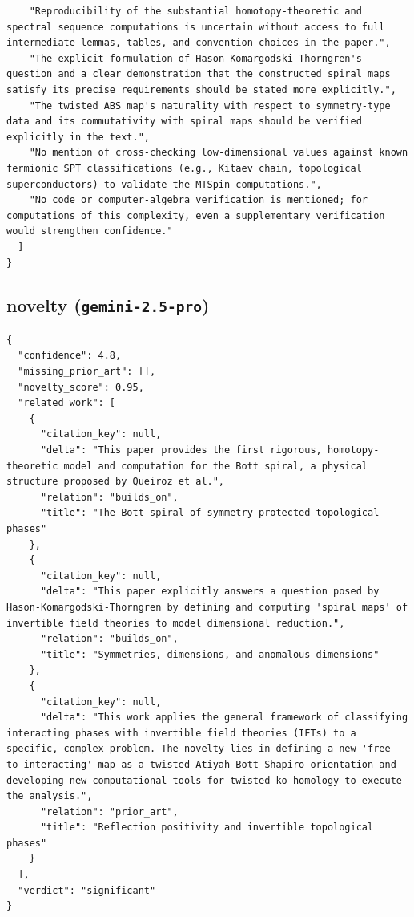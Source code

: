 \documentclass[11pt]{article}
\begin{document}
\begin{verbatim}
    "Reproducibility of the substantial homotopy-theoretic and spectral sequence computations is uncertain without access to full intermediate lemmas, tables, and convention choices in the paper.",
    "The explicit formulation of Hason–Komargodski–Thorngren's question and a clear demonstration that the constructed spiral maps satisfy its precise requirements should be stated more explicitly.",
    "The twisted ABS map's naturality with respect to symmetry-type data and its commutativity with spiral maps should be verified explicitly in the text.",
    "No mention of cross-checking low-dimensional values against known fermionic SPT classifications (e.g., Kitaev chain, topological superconductors) to validate the MTSpin computations.",
    "No code or computer-algebra verification is mentioned; for computations of this complexity, even a supplementary verification would strengthen confidence."
  ]
}
\end{verbatim}

\subsection*{novelty (\texttt{gemini-2.5-pro})}
\begin{verbatim}
{
  "confidence": 4.8,
  "missing_prior_art": [],
  "novelty_score": 0.95,
  "related_work": [
    {
      "citation_key": null,
      "delta": "This paper provides the first rigorous, homotopy-theoretic model and computation for the Bott spiral, a physical structure proposed by Queiroz et al.",
      "relation": "builds_on",
      "title": "The Bott spiral of symmetry-protected topological phases"
    },
    {
      "citation_key": null,
      "delta": "This paper explicitly answers a question posed by Hason-Komargodski-Thorngren by defining and computing 'spiral maps' of invertible field theories to model dimensional reduction.",
      "relation": "builds_on",
      "title": "Symmetries, dimensions, and anomalous dimensions"
    },
    {
      "citation_key": null,
      "delta": "This work applies the general framework of classifying interacting phases with invertible field theories (IFTs) to a specific, complex problem. The novelty lies in defining a new 'free-to-interacting' map as a twisted Atiyah-Bott-Shapiro orientation and developing new computational tools for twisted ko-homology to execute the analysis.",
      "relation": "prior_art",
      "title": "Reflection positivity and invertible topological phases"
    }
  ],
  "verdict": "significant"
}
\end{verbatim}
\end{document}
